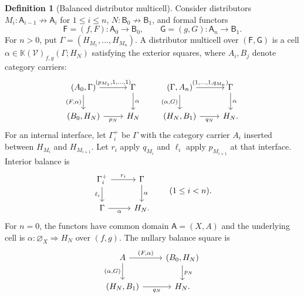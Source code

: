 \documentclass[11pt,reqno]{amsart}
\theoremstyle{plain}
\theoremstyle{definition}
\newtheorem{definition}[theorem]{Definition}
\theoremstyle{remark}
\numberwithin{equation}{section}
\newcommand{\V}{\mathcal V}
\newcommand{\Kcal}{\mathbb K}
\newcommand{\harr}{\mathrel{\nrightarrow}}
\newcommand{\cell}{\mathrel{\Longrightarrow}}
\newcommand{\emp}[1]{\varnothing_{#1}}
\begin{document}
\begin{definition}[Balanced distributor multicell]\label{def:distcell}
Consider distributors
$M_i:\mathsf A_{i-1}\harr\mathsf A_i$ for $1\leq i\leq n$,
$N:\mathsf B_0\harr\mathsf B_1$, and formal functors
\[
 \mathsf F=(f,F):\mathsf A_0\to\mathsf B_0,
 \qquad
 \mathsf G=(g,G):\mathsf A_n\to\mathsf B_1.
\]
For $n>0$, put $\Gamma=(H_{M_1},\ldots,H_{M_n})$. A distributor
multicell over $(\mathsf F,\mathsf G)$ is a cell
$\alpha\in\Kcal(\V)_{f,g}(\Gamma;H_N)$ satisfying the exterior squares, where $A_i,B_j$ denote category carriers:
\begin{equation}\label{eq:distexterior}
\begin{tikzcd}[column sep=2.4em]
(A_0,\Gamma) \arrow[r,"{(p_{M_1},1,\ldots,1)}"]
  \arrow[d,"{(F,\alpha)}"'] & \Gamma \arrow[d,"\alpha"]\\
(B_0,H_N) \arrow[r,"p_N"'] & H_N
\end{tikzcd}
\qquad
\begin{tikzcd}[column sep=2.4em]
(\Gamma,A_n) \arrow[r,"{(1,\ldots,1,q_{M_n})}"]
  \arrow[d,"{(\alpha,G)}"'] & \Gamma \arrow[d,"\alpha"]\\
(H_N,B_1) \arrow[r,"q_N"'] & H_N.
\end{tikzcd}
\end{equation}
For an internal interface, let $\Gamma_i^+$ be $\Gamma$ with the
category carrier $A_i$ inserted between $H_{M_i}$ and $H_{M_{i+1}}$.
Let $r_i$ apply $q_{M_i}$ and $\ell_i$ apply $p_{M_{i+1}}$ at that
interface. Interior balance is
\begin{equation}\label{eq:distbalance}
\begin{tikzcd}
\Gamma_i^+ \arrow[r,"r_i"] \arrow[d,"\ell_i"'] &
\Gamma \arrow[d,"\alpha"]\\
\Gamma \arrow[r,"\alpha"'] & H_N.
\end{tikzcd}
\qquad(1\leq i<n).
\end{equation}
For $n=0$, the functors have common domain $\mathsf A=(X,A)$ and
the underlying cell is $\alpha:\emp X\cell H_N$ over $(f,g)$.
The nullary balance square is
\begin{equation}\label{eq:distnullary}
\begin{tikzcd}
A \arrow[r,"{(F,\alpha)}"] \arrow[d,"{(\alpha,G)}"'] &
(B_0,H_N) \arrow[d,"p_N"]\\
(H_N,B_1) \arrow[r,"q_N"'] & H_N.
\end{tikzcd}
\end{equation}
\end{definition}
\end{document}
